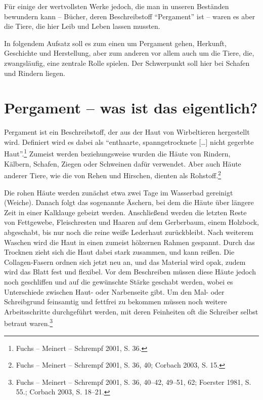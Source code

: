 \documentclass[a4paper,
fontsize=11pt,
oneside,
numbers=noperiodatend,
parskip=half-,
bibliography=totoc,
final
]{scrartcl}
\begin{document}
Für einige der wertvollsten Werke jedoch, die man in unseren Beständen
bewundern kann -- Bücher, deren Beschreibstoff \enquote{Pergament} ist --
waren es aber die Tiere, die hier Leib und Leben lassen mussten.

In folgendem Aufsatz soll es zum einen um Pergament gehen, Herkunft,
Geschichte und Herstellung, aber zum anderen vor allem auch um die
Tiere, die, zwangsläufig, eine zentrale Rolle spielen. Der Schwerpunkt
soll hier bei Schafen und Rindern liegen.

\hypertarget{pergament-was-ist-das-eigentlich}{%
\section{Pergament -- was ist das
eigentlich?}\label{pergament-was-ist-das-eigentlich}}

Pergament ist ein Beschreibstoff, der aus der Haut von Wirbeltieren
hergestellt wird. Definiert wird es dabei als \enquote{enthaarte,
spanngetrocknete {[}\ldots{]} nicht gegerbte Haut}.\footnote{Fuchs --
  Meinert -- Schrempf 2001, S. 36.} Zumeist werden beziehungsweise
wurden die Häute von Rindern, Kälbern, Schafen, Ziegen oder Schweinen
dafür verwendet. Aber auch Häute anderer Tiere, wie die von Rehen und
Hirschen, dienten als Rohstoff.\footnote{Fuchs -- Meinert -- Schrempf
  2001, S. 36, 40; Corbach 2003, S. 15.}

Die rohen Häute werden zunächst etwa zwei Tage im Wasserbad gereinigt
(Weiche). Danach folgt das sogenannte Äschern, bei dem die Häute über
längere Zeit in einer Kalklauge gebeizt werden. Anschließend werden die
letzten Reste von Fettgewebe, Fleischresten und Haaren auf dem
Gerberbaum, einem Holzbock, abgeschabt, bis nur noch die reine weiße
Lederhaut zurückbleibt. Nach weiterem Waschen wird die Haut in einen
zumeist hölzernen Rahmen gespannt. Durch das Trocknen zieht sich die
Haut dabei stark zusammen, und kann reißen. Die Collagen-Fasern ordnen
sich jetzt neu an, und das Material wird opak, zudem wird das Blatt fest
und flexibel. Vor dem Beschreiben müssen diese Häute jedoch noch
geschliffen und auf die gewünschte Stärke geschabt werden, wobei es
Unterschiede zwischen Haut- oder Narbenseite gibt. Um den Mal- oder
Schreibgrund feinsamtig und fettfrei zu bekommen müssen noch weitere
Arbeitsschritte durchgeführt werden, mit deren Feinheiten oft die
Schreiber selbst betraut waren.\footnote{Fuchs -- Meinert -- Schrempf
  2001, S. 36, 40--42, 49--51, 62; Foerster 1981, S. 55.; Corbach 2003,
  S. 18--21.}
\end{document}
